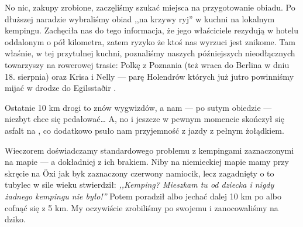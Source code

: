 
No nic, zakupy zrobione, zaczęliśmy szukać miejsca na przygotowanie obiadu. Po dłuższej naradzie wybraliśmy obiad ,,na krzywy ryj'' w kuchni na lokalnym kempingu. Zachęciła nas do tego informacja, że jego właściciele rezydują w hotelu oddalonym o pół kilometra, zatem ryzyko że ktoś nas wyrzuci jest znikome. Tam właśnie, w tej przytulnej kuchni, poznaliśmy naszych późniejszych nieodłącznych towarzyszy na rowerowej trasie: Polkę z Poznania (też wraca do Berlina w dniu 18. sierpnia) oraz Krisa i Nelly --- parę Holendrów których już jutro powinniśmy mijać w drodze do Egilsstaðir .

Ostatnie 10 km drogi to znów wygwizdów, a nam --- po sutym obiedzie --- niezbyt chce się pedałować… A, no i jeszcze w pewnym momencie skończył się asfalt na , co dodatkowo psuło nam przyjemność z jazdy z pełnym żołądkiem.


Wieczorem doświadczamy standardowego problemu z kempingami zaznaczonymi na mapie --- a dokładniej z ich brakiem. Niby na niemieckiej mapie mamy przy skręcie na Öxi jak byk zaznaczony czerwony namiocik, lecz zagadnięty o to tubylec w sile wieku stwierdził: \emph{,,Kemping? Mieszkam tu od dziecka i nigdy żadnego kempingu nie było!''} Potem poradził albo jechać dalej 10 km po  albo cofnąć się z 5 km. My oczywiście zrobiliśmy po swojemu i zanocowaliśmy na dziko.